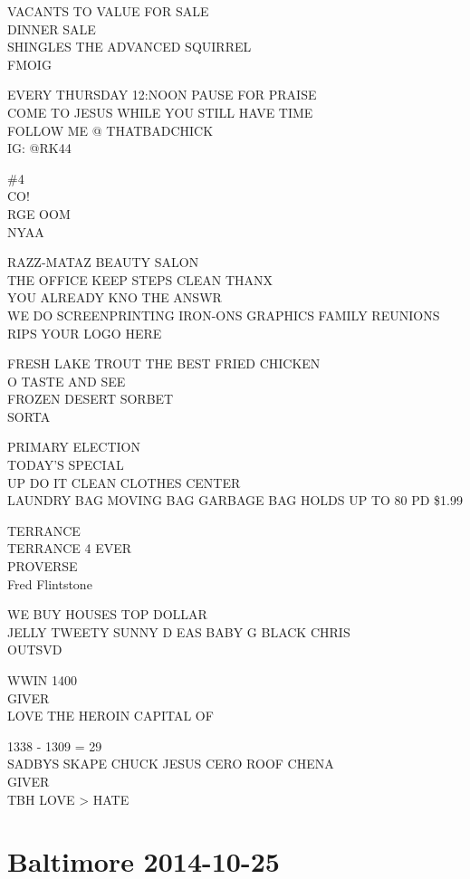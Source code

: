 \documentclass[10pt,letterpaper]{article}
\begin{document}
VACANTS TO VALUE FOR SALE\\
DINNER SALE\\
SHINGLES THE ADVANCED SQUIRREL\\
FMOIG

EVERY THURSDAY 12:NOON PAUSE FOR PRAISE\\
COME TO JESUS WHILE YOU STILL HAVE TIME\\
FOLLOW ME @ THATBADCHICK\\
IG: @RK44

\#4\\
CO!\\
RGE OOM\\
NYAA

RAZZ{-}MATAZ BEAUTY SALON\\
THE OFFICE KEEP STEPS CLEAN THANX\\
YOU ALREADY KNO THE ANSWR\\
WE DO SCREENPRINTING IRON{-}ONS GRAPHICS FAMILY REUNIONS RIPS YOUR LOGO HERE

FRESH LAKE TROUT THE BEST FRIED CHICKEN\\
O TASTE AND SEE\\
FROZEN DESERT SORBET\\
SORTA

PRIMARY ELECTION\\
TODAY'S SPECIAL\\
UP DO IT CLEAN CLOTHES CENTER\\
LAUNDRY BAG MOVING BAG GARBAGE BAG HOLDS UP TO 80 PD \$1.99

TERRANCE\\
TERRANCE 4 EVER\\
PROVERSE\\
Fred Flintstone

WE BUY HOUSES TOP DOLLAR\\
JELLY TWEETY SUNNY D EAS BABY G BLACK CHRIS\\
OUTSVD

WWIN 1400\\
GIVER\\
LOVE THE HEROIN CAPITAL OF

1338 {-} 1309 = 29\\
SADBYS SKAPE CHUCK JESUS CERO ROOF CHENA\\
GIVER\\
TBH LOVE > HATE
\

\section*{Baltimore 2014-10-25}
\end{document}
